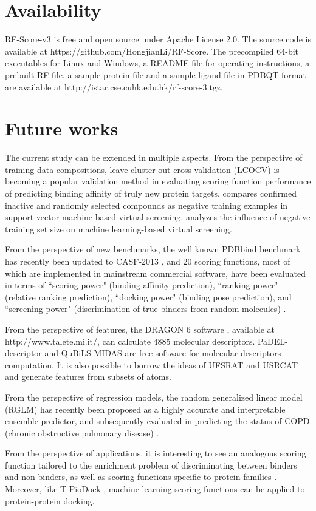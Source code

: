 \section{Availability}

RF-Score-v3 is free and open source under Apache License 2.0. The source code is available at https://github.com/HongjianLi/RF-Score. The precompiled 64-bit executables for Linux and Windows, a README file for operating instructions, a prebuilt RF file, a sample protein file and a sample ligand file in PDBQT format are available at http://istar.cse.cuhk.edu.hk/rf-score-3.tgz.

\section{Future works}

The current study can be extended in multiple aspects. From the perspective of training data compositions, leave-cluster-out cross validation (LCOCV) \citep{774} is becoming a popular validation method in evaluating scoring function performance of predicting binding affinity of truly new protein targets. \citep{1423} compares confirmed inactive and randomly selected compounds as negative training examples in support vector machine-based virtual screening. \citep{1404} analyzes the influence of negative training set size on machine learning-based virtual screening.

From the perspective of new benchmarks, the well known PDBbind benchmark has recently been updated to CASF-2013 \citep{1426}, and 20 scoring functions, most of which are implemented in mainstream commercial software, have been evaluated in terms of ``scoring power" (binding affinity prediction), ``ranking power" (relative ranking prediction), ``docking power" (binding pose prediction), and ``screening power" (discrimination of true binders from random molecules) \citep{1411}.

From the perspective of features, the DRAGON 6 software \citep{1478}, available at http://www.talete.mi.it/, can calculate 4885 molecular descriptors. PaDEL-descriptor \citep{1479} and QuBiLS-MIDAS \citep{1400} are free software for molecular
descriptors computation. It is also possible to borrow the ideas of UFSRAT \citep{1436} and USRCAT \citep{1331} and generate features from subsets of atoms.

From the perspective of regression models, the random generalized linear model (RGLM) has recently been proposed \citep{1377} as a highly accurate and interpretable ensemble predictor, and subsequently evaluated in predicting the status of COPD (chronic
obstructive pulmonary disease) \citep{1418}.

From the perspective of applications, it is interesting to see an analogous scoring function tailored to the enrichment problem of discriminating between binders and non-binders, as well as scoring functions specific to protein families \citep{1635}. Moreover, like T-PioDock \citep{1399}, machine-learning scoring functions can be applied to protein-protein docking.

\chapterend
